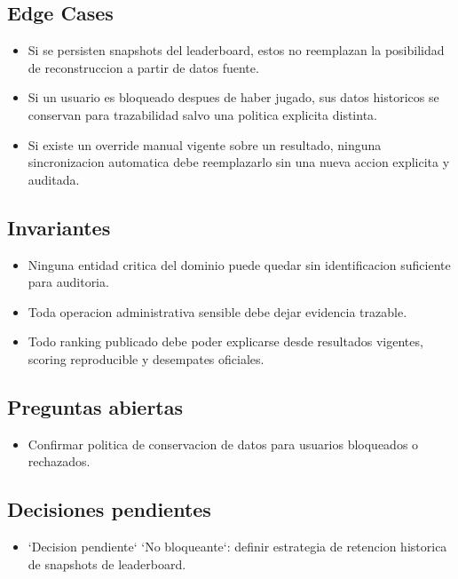 \subsection{Edge Cases}

\begin{itemize}
  \item Si se persisten snapshots del leaderboard, estos no reemplazan la posibilidad de reconstruccion a partir de datos fuente.
  \item Si un usuario es bloqueado despues de haber jugado, sus datos historicos se conservan para trazabilidad salvo una politica explicita distinta.
  \item Si existe un override manual vigente sobre un resultado, ninguna sincronizacion automatica debe reemplazarlo sin una nueva accion explicita y auditada.
\end{itemize}

\subsection{Invariantes}

\begin{itemize}
  \item Ninguna entidad critica del dominio puede quedar sin identificacion suficiente para auditoria.
  \item Toda operacion administrativa sensible debe dejar evidencia trazable.
  \item Todo ranking publicado debe poder explicarse desde resultados vigentes, scoring reproducible y desempates oficiales.
\end{itemize}

\subsection{Preguntas abiertas}

\begin{itemize}
  \item Confirmar politica de conservacion de datos para usuarios bloqueados o rechazados.
\end{itemize}

\subsection{Decisiones pendientes}

\begin{itemize}
  \item `Decision pendiente` `No bloqueante`: definir estrategia de retencion historica de snapshots de leaderboard.
\end{itemize}
